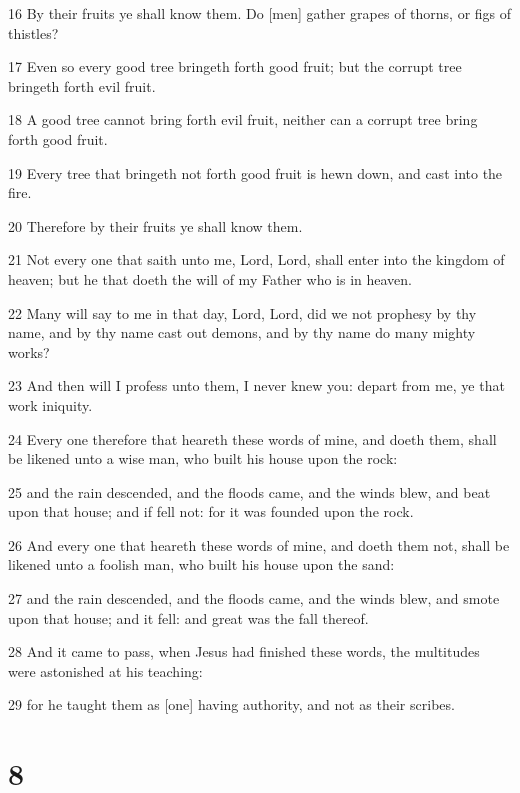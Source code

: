 \par 16 By their fruits ye shall know them. Do [men] gather grapes of thorns, or figs of thistles?
\par 17 Even so every good tree bringeth forth good fruit; but the corrupt tree bringeth forth evil fruit.
\par 18 A good tree cannot bring forth evil fruit, neither can a corrupt tree bring forth good fruit.
\par 19 Every tree that bringeth not forth good fruit is hewn down, and cast into the fire.
\par 20 Therefore by their fruits ye shall know them.
\par 21 Not every one that saith unto me, Lord, Lord, shall enter into the kingdom of heaven; but he that doeth the will of my Father who is in heaven.
\par 22 Many will say to me in that day, Lord, Lord, did we not prophesy by thy name, and by thy name cast out demons, and by thy name do many mighty works?
\par 23 And then will I profess unto them, I never knew you: depart from me, ye that work iniquity.
\par 24 Every one therefore that heareth these words of mine, and doeth them, shall be likened unto a wise man, who built his house upon the rock:
\par 25 and the rain descended, and the floods came, and the winds blew, and beat upon that house; and if fell not: for it was founded upon the rock.
\par 26 And every one that heareth these words of mine, and doeth them not, shall be likened unto a foolish man, who built his house upon the sand:
\par 27 and the rain descended, and the floods came, and the winds blew, and smote upon that house; and it fell: and great was the fall thereof.
\par 28 And it came to pass, when Jesus had finished these words, the multitudes were astonished at his teaching:
\par 29 for he taught them as [one] having authority, and not as their scribes.

\chapter{8}

